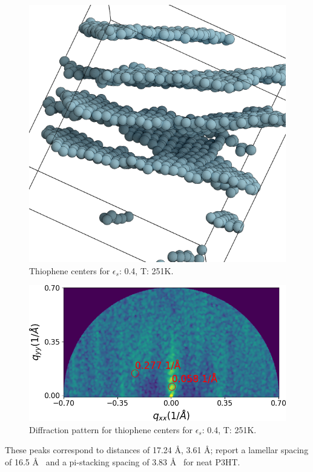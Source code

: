\begin{figure}
    \centering
    \includegraphics[width=0.8\linewidth]{figures/p3ht_val/cg-trajectory_scene.png}
    \caption{Thiophene centers for $\epsilon_{s}$: 0.4, T: 251K.}\label{highorder-centers}
\end{figure}

\begin{figure}
    \centering
    \includegraphics[width=0.8\linewidth]{figures/p3ht_val/cg-trajectory_dp0.png}
    \caption{Diffraction pattern for thiophene centers for $\epsilon_{s}$: 0.4, T: 251K.}\label{highorder-dp}
\end{figure}

These peaks correspond to distances of 17.24 \AA, 3.61 \AA; \citet{Duong2013} report a lamellar spacing of 16.5 \AA~ and a pi-stacking spacing of 3.83 \AA~ for neat P3HT.

